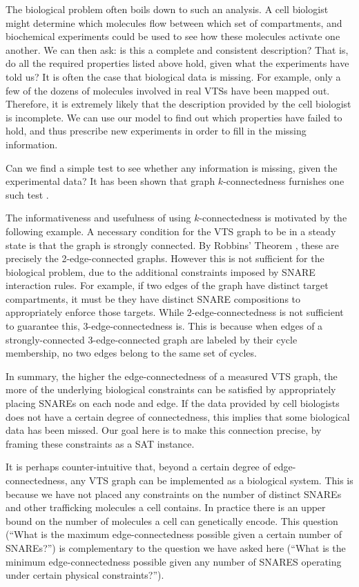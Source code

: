 The biological problem often boils down to such an analysis. A cell biologist might determine which molecules flow between which set of compartments, and biochemical experiments could be used to see how these molecules activate one another. We can then ask: is this a complete and consistent description? That is, do all the required properties listed above hold, given what the experiments have told us? It is often the case that biological data is missing. For example, only a few of the dozens of molecules involved in real VTSs have been mapped out. Therefore, it is extremely likely that the description provided by the cell biologist is incomplete. We can use our model to find out which properties have failed to hold, and thus prescribe new experiments in order to fill in the missing information.

Can we find a simple test to see whether any information is missing, given the experimental data? It has been shown that graph $k$-connectedness furnishes one such test \cite{shukla2017discovering}. 

The informativeness and usefulness of using $k$-connectedness is motivated by the following example. A necessary condition for the VTS graph to be in a steady state is that the graph is strongly connected. By Robbins' Theorem \cite{robbins1939theorem}, these are precisely the 2-edge-connected graphs. However this is not sufficient for the biological problem, due to the additional constraints imposed by SNARE interaction rules. For example, if two edges of the graph have distinct target compartments, it must be they have distinct SNARE compositions to appropriately enforce those targets. While 2-edge-connectedness is not sufficient to guarantee this, 3-edge-connectedness is. This is because when edges of a strongly-connected 3-edge-connected graph are labeled by their cycle membership, no two edges belong to the same set of cycles.

In summary, the higher the edge-connectedness of a measured VTS graph, the more of the underlying biological constraints can be satisfied by appropriately placing SNAREs on each node and edge. If the data provided by cell biologists does not have a certain degree of connectedness, this implies that some biological data has been missed. Our goal here is to make this connection precise, by framing these constraints as a SAT instance.

It is perhaps counter-intuitive that, beyond a certain degree of edge-connectedness, any VTS graph can be implemented as a biological system. This is because we have not placed any constraints on the number of distinct SNAREs and other trafficking molecules a cell contains. In practice there is an upper bound on the number of molecules a cell can genetically encode. This question (``What is the maximum edge-connectedness possible given a certain number of SNAREs?'') is complementary to the question we have asked here (``What is the minimum edge-connectedness possible given any number of SNARES operating under certain physical constraints?'').


